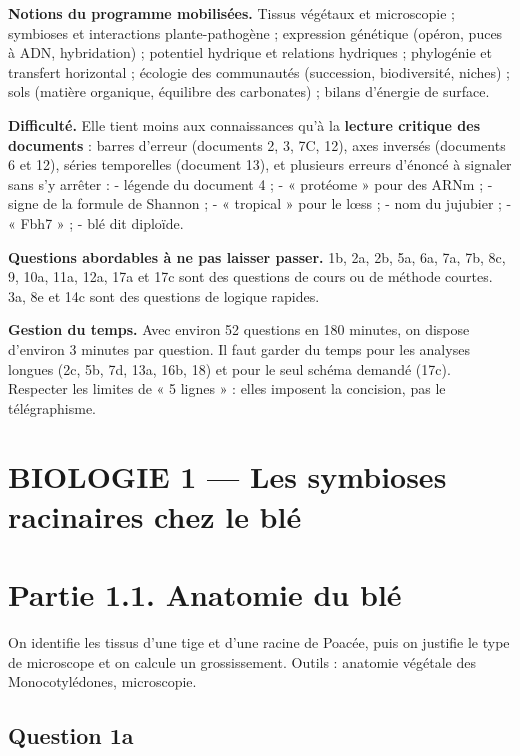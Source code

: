 \documentclass[11pt,a4paper]{article}
\begin{document}
\textbf{Notions du programme mobilisées.} Tissus végétaux et microscopie ; symbioses et interactions plante-pathogène ; expression génétique (opéron, puces à ADN, hybridation) ; potentiel hydrique et relations hydriques ; phylogénie et transfert horizontal ; écologie des communautés (succession, biodiversité, niches) ; sols (matière organique, équilibre des carbonates) ; bilans d'énergie de surface.

\textbf{Difficulté.} Elle tient moins aux connaissances qu'à la \textbf{lecture critique des documents} : barres d'erreur (documents 2, 3, 7C, 12), axes inversés (documents 6 et 12), séries temporelles (document 13), et plusieurs erreurs d'énoncé à signaler sans s'y arrêter :
- légende du document 4 ;
- « protéome » pour des ARNm ;
- signe de la formule de Shannon ;
- « tropical » pour le lœss ;
- nom du jujubier ;
- « Fbh7 » ;
- blé dit diploïde.

\textbf{Questions abordables à ne pas laisser passer.} 1b, 2a, 2b, 5a, 6a, 7a, 7b, 8c, 9, 10a, 11a, 12a, 17a et 17c sont des questions de cours ou de méthode courtes. 3a, 8e et 14c sont des questions de logique rapides.

\textbf{Gestion du temps.} Avec environ 52 questions en 180 minutes, on dispose d'environ 3 minutes par question. Il faut garder du temps pour les analyses longues (2c, 5b, 7d, 13a, 16b, 18) et pour le seul schéma demandé (17c). Respecter les limites de « 5 lignes » : elles imposent la concision, pas le télégraphisme.

\hypertarget{biologie-1-les-symbioses-racinaires-chez-le-bluxe9}{%
\section{BIOLOGIE 1 --- Les symbioses racinaires chez le blé}\label{biologie-1-les-symbioses-racinaires-chez-le-bluxe9}}

\hypertarget{partie-1.1.-anatomie-du-bluxe9}{%
\section{Partie 1.1. Anatomie du blé}\label{partie-1.1.-anatomie-du-bluxe9}}

On identifie les tissus d'une tige et d'une racine de Poacée, puis on justifie le type de microscope et on calcule un grossissement. Outils : anatomie végétale des Monocotylédones, microscopie.

\hypertarget{question-1a}{%
\subsection{Question 1a}\label{question-1a}}
\end{document}
